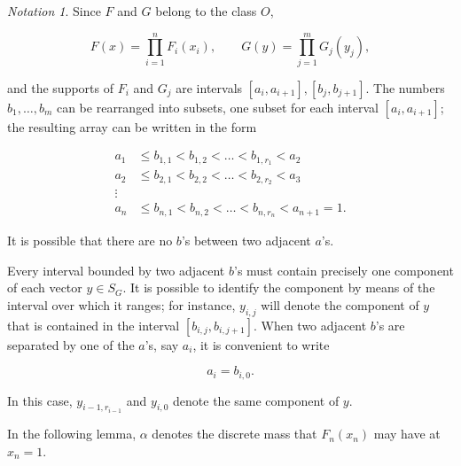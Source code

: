 \documentclass{article}
\theoremstyle{remark}
\newtheorem{notation}{Notation}
\begin{document}
\begin{notation}

Since $F$ and $G$ belong to the class $O$,

\[
F(x) = \prod_{i=1}^n F_i(x_i), \qquad G(y) = \prod_{j=1}^m G_j(y_j),
\]

and the supports of $F_i$ and $G_j$ are intervals $[a_i, a_{i+1}], [b_j,
b_{j+1}]$. The numbers $b_1, \dots, b_m$ can be rearranged into subsets, one
subset for each interval $[a_i, a_{i+1}]$; the resulting array can be written
in the form

\[
\begin{aligned}
a_1 &\leq b_{1,1} < b_{1, 2} < \dots < b_{1, r_1} < a_2 \\
a_2 &\leq b_{2,1} < b_{2, 2} < \dots < b_{2, r_2} < a_3 \\
\vdots & \\
a_n &\leq b_{n,1} < b_{n, 2} < \dots < b_{n, r_n} < a_{n+1} = 1.
\end{aligned}
\]

It is possible that there are no $b$'s between two adjacent $a$'s.

Every interval bounded by two adjacent $b$'s must contain precisely one
component of each vector $y \in S_G$. It is possible to identify the component
by means of the interval over which it ranges; for instance, $y_{i,j}$ will
denote the component of $y$ that is contained in the interval $[b_{i,j}, b_{i,
j+1}]$. When two adjacent $b$'s are separated by one of the $a$'s, say $a_i$,
it is convenient to write

\[
    a_i = b_{i, 0}.
\]

In this case, $y_{i-1, r_{i-1}}$ and $y_{i, 0}$ denote the same component of
$y$.

\end{notation}

In the following lemma, $\alpha$ denotes the discrete mass that $F_n(x_n)$ may
have at $x_n = 1$.
\end{document}
